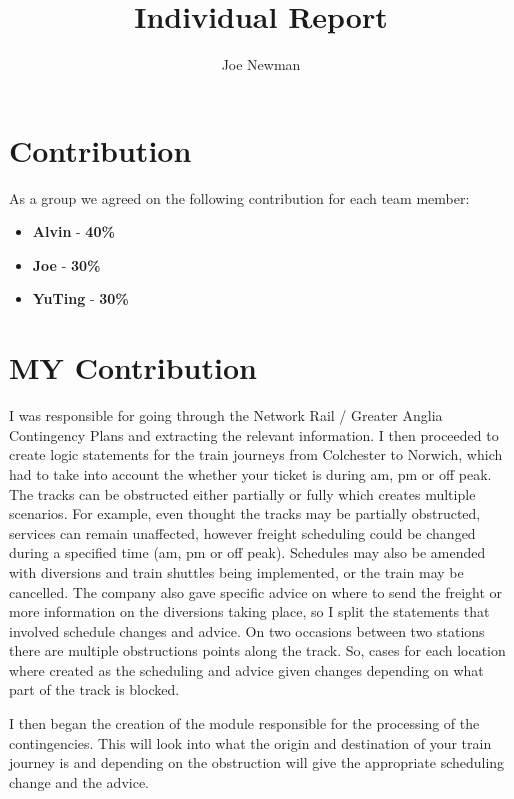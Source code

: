 \documentclass{article}
\title{Individual Report}
\author{Joe Newman}
\date{}
\begin{document}
\maketitle


\section{Contribution}
As a group we agreed on the following contribution for each team member:
\begin{itemize}
	\item \textbf{Alvin}  - \textbf{40\%}
	\item \textbf{Joe}    - \textbf{30\%} 
	\item \textbf{YuTing} - \textbf{30\%}
\end{itemize}


\section{MY Contribution}
I was responsible for going through the Network Rail / Greater Anglia Contingency Plans and extracting the relevant information. I then proceeded to create logic statements for the train journeys from Colchester to Norwich, which had to take into account the whether your ticket is during am, pm or off peak. The tracks can be obstructed either partially or fully which creates multiple scenarios. For example, even thought the tracks may be partially obstructed, services can remain unaffected, however freight scheduling could be changed during a specified time (am, pm or off peak). Schedules may also be amended with diversions and train shuttles being implemented, or the train may be cancelled. The company also gave specific advice on where to send the freight or more information on the diversions taking place, so I split the statements that involved schedule changes and advice. On two occasions between two stations there are multiple obstructions points along the track. So, cases for each location where created as the scheduling and advice given changes depending on what part of the track is blocked. 

I then began the creation of the module responsible for the processing of the contingencies. This will look into what the origin and destination of your train journey is and depending on the obstruction will give the appropriate scheduling change and the advice. 
\end{document}
